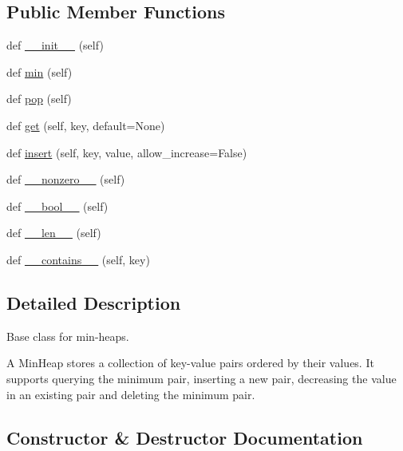 \subsection*{Public Member Functions}
\begin{DoxyCompactItemize}
\item 
def \hyperlink{classnetworkx_1_1utils_1_1heaps_1_1MinHeap_a810428493eac084c9e62cfd05c362ad6}{\+\_\+\+\_\+init\+\_\+\+\_\+} (self)
\item 
def \hyperlink{classnetworkx_1_1utils_1_1heaps_1_1MinHeap_a9544b6eaa60f41932c0c65b7647d6c7f}{min} (self)
\item 
def \hyperlink{classnetworkx_1_1utils_1_1heaps_1_1MinHeap_ac409c9d8f48dc8f4b6f157372b50bc64}{pop} (self)
\item 
def \hyperlink{classnetworkx_1_1utils_1_1heaps_1_1MinHeap_a223ebafd83fab0dfac350a82745b8026}{get} (self, key, default=None)
\item 
def \hyperlink{classnetworkx_1_1utils_1_1heaps_1_1MinHeap_af63fb33348bce3bd8e8e088e907ec6dd}{insert} (self, key, value, allow\+\_\+increase=False)
\item 
def \hyperlink{classnetworkx_1_1utils_1_1heaps_1_1MinHeap_acc3f3051b09676d65144f4cbd4a07cf1}{\+\_\+\+\_\+nonzero\+\_\+\+\_\+} (self)
\item 
def \hyperlink{classnetworkx_1_1utils_1_1heaps_1_1MinHeap_adbda11e88d6aee34134689bb4e622dd9}{\+\_\+\+\_\+bool\+\_\+\+\_\+} (self)
\item 
def \hyperlink{classnetworkx_1_1utils_1_1heaps_1_1MinHeap_a2f60e9995f17e7d57259ad8c658008eb}{\+\_\+\+\_\+len\+\_\+\+\_\+} (self)
\item 
def \hyperlink{classnetworkx_1_1utils_1_1heaps_1_1MinHeap_a97ae2c56d0ce87d0db122a512356f321}{\+\_\+\+\_\+contains\+\_\+\+\_\+} (self, key)
\end{DoxyCompactItemize}


\subsection{Detailed Description}
\begin{DoxyVerb}Base class for min-heaps.

A MinHeap stores a collection of key-value pairs ordered by their values.
It supports querying the minimum pair, inserting a new pair, decreasing the
value in an existing pair and deleting the minimum pair.
\end{DoxyVerb}
 

\subsection{Constructor \& Destructor Documentation}
\mbox{\label{classnetworkx_1_1utils_1_1heaps_1_1MinHeap_a810428493eac084c9e62cfd05c362ad6}} 
